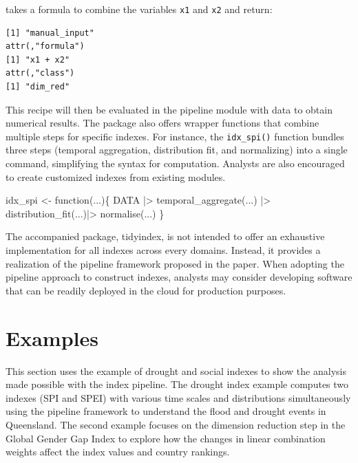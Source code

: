 \documentclass[
]{interact}
\newenvironment{Shaded}{\begin{snugshade}}{\end{snugshade}}
\newcommand{\ControlFlowTok}[1]{\textcolor[rgb]{0.00,0.23,0.31}{#1}}
\newcommand{\FunctionTok}[1]{\textcolor[rgb]{0.28,0.35,0.67}{#1}}
\newcommand{\NormalTok}[1]{\textcolor[rgb]{0.00,0.23,0.31}{#1}}
\newcommand{\OtherTok}[1]{\textcolor[rgb]{0.00,0.23,0.31}{#1}}
\newcommand{\SpecialCharTok}[1]{\textcolor[rgb]{0.37,0.37,0.37}{#1}}
\begin{document}
takes a formula to combine the variables \texttt{x1} and \texttt{x2} and
return:

\begin{verbatim}
[1] "manual_input"
attr(,"formula")
[1] "x1 + x2"
attr(,"class")
[1] "dim_red"
\end{verbatim}

This recipe will then be evaluated in the pipeline module with data to
obtain numerical results. The package also offers wrapper functions that
combine multiple steps for specific indexes. For instance, the
\texttt{idx\_spi()} function bundles three steps (temporal aggregation,
distribution fit, and normalizing) into a single command, simplifying
the syntax for computation. Analysts are also encouraged to create
customized indexes from existing modules.

\begin{Shaded}
\begin{Highlighting}[]
\NormalTok{idx\_spi }\OtherTok{\textless{}{-}} \ControlFlowTok{function}\NormalTok{(...)\{}
\NormalTok{  DATA }\SpecialCharTok{|\textgreater{}} \FunctionTok{temporal\_aggregate}\NormalTok{(...) }\SpecialCharTok{|\textgreater{}} \FunctionTok{distribution\_fit}\NormalTok{(...)}\SpecialCharTok{|\textgreater{}} \FunctionTok{normalise}\NormalTok{(...)}
\NormalTok{\}}
\end{Highlighting}
\end{Shaded}

The accompanied package, tidyindex, is not intended to offer an
exhaustive implementation for all indexes across every domains. Instead,
it provides a realization of the pipeline framework proposed in the
paper. When adopting the pipeline approach to construct indexes,
analysts may consider developing software that can be readily deployed
in the cloud for production purposes.

\section{Examples}\label{sec-examples}

This section uses the example of drought and social indexes to show the
analysis made possible with the index pipeline. The drought index
example computes two indexes (SPI and SPEI) with various time scales and
distributions simultaneously using the pipeline framework to understand
the flood and drought events in Queensland. The second example focuses
on the dimension reduction step in the Global Gender Gap Index to
explore how the changes in linear combination weights affect the index
values and country rankings.
\end{document}
